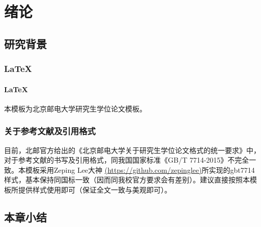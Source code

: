 \chapter{绪论}
\section{研究背景}
\subsection{\LaTeX}
\subsubsection{\LaTeX}

本模板为北京邮电大学研究生学位论文模板\cite{ddpg}。

\subsection{关于参考文献及引用格式}

目前，北邮官方给出的《北京邮电大学关于研究生学位论文格式的统一要求》中，对于参考文献的书写及引用格式，同我国国家标准《GB/T 7714-2015》\cite{gbt7714}不完全一致。本模板采用Zeping Lee大神 \href{https://github.com/zepinglee}{(https://github.com/zepinglee)}所实现的gbt7714样式，基本保持同国标一致（因而同我校官方要求会有差别）。建议直接按照本模板所提供样式使用即可（保证全文一致与美观即可）。

\section{本章小结}

